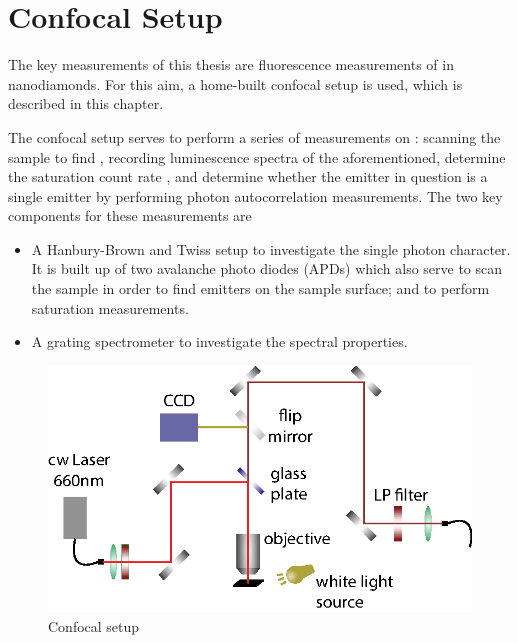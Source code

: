
\chapter{Confocal Setup}	\label{ch::confocal_setup}

	The key measurements of this thesis are fluorescence measurements of \sivs in nanodiamonds.
	For this aim, a home-built confocal setup is used, which is described in this chapter.

	The confocal setup serves to perform a series of measurements on \fl: scanning the sample to find \sivs, recording luminescence spectra of the aforementioned, determine the saturation count rate , and determine whether the emitter in question is a single emitter by performing photon autocorrelation measurements.
	The two key components for these measurements are 

	\begin{itemize}
		\item A Hanbury-Brown and Twiss setup to investigate the single photon character. It is built up of two avalanche photo diodes (APDs) which also serve to scan the sample in order to find emitters on the sample surface; and to perform saturation measurements.
		\item A grating spectrometer to investigate the spectral properties.
	\end{itemize}


	\begin{figure}[t] %
		\centering
		\includegraphics[width=\linewidth]{./pics/confocal_setup.eps}
		\caption{Confocal setup}
		\label{fig::confocal_setup}
	\end{figure}

